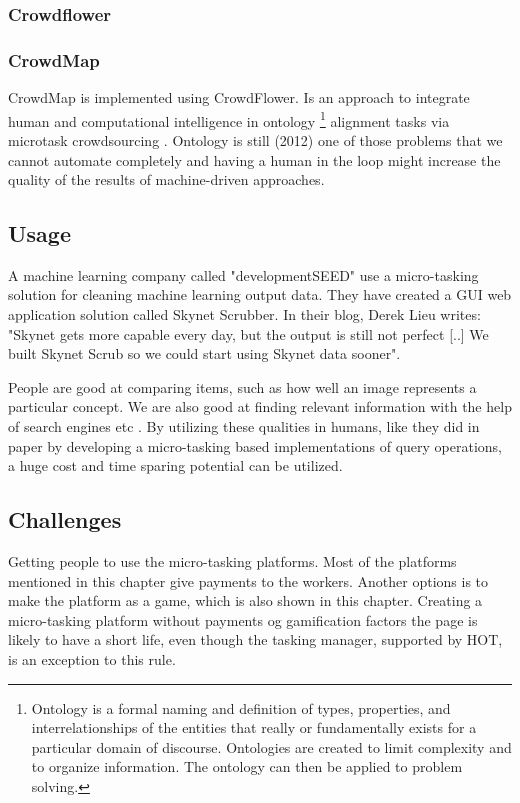 \subsubsection{Crowdflower}
\subsubsection{CrowdMap}

CrowdMap is implemented using CrowdFlower. 
Is an approach to integrate human and computational intelligence in ontology \footnote{\label{ontology} Ontology is a formal naming and definition of types, properties, and interrelationships of the entities that really or fundamentally exists for a particular domain of discourse. Ontologies are created to limit complexity and to organize information. The ontology can then be applied to problem solving. } alignment tasks via microtask crowdsourcing \citep{Sarasua2012}. Ontology is still (2012) one of those problems that we cannot automate completely and having a human in the loop might increase the quality of the results of machine-driven approaches. 





\subsection{Usage}
A machine learning company called "developmentSEED" use a micro-tasking solution for cleaning machine learning output data. They have created a GUI web application solution called Skynet Scrubber. In their blog, Derek Lieu writes: "Skynet gets more capable every day, but the output is still not perfect [..] We built Skynet Scrub so we could start using Skynet data sooner". 

People are good at comparing items, such as how well an image represents a particular concept. We are also good at finding relevant information with the help of search engines etc \citep{Franklin2011}. By utilizing these qualities in humans, like they did in \citep{Franklin2011} paper by developing a micro-tasking based implementations of query operations, a huge cost and time sparing potential can be utilized. 

\subsection{Challenges}
Getting people to use the micro-tasking platforms. Most of the platforms mentioned in this chapter give payments to the workers. Another options is to make the platform as a game, which is also shown in this chapter. Creating a micro-tasking platform without payments og gamification factors the page is likely to have a short life, even though the tasking manager, supported by HOT, is an exception to this rule. 

